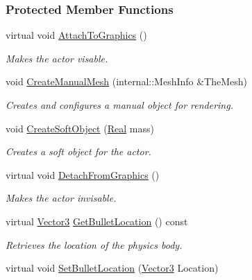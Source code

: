 \subsubsection*{Protected Member Functions}
\begin{DoxyCompactItemize}
\item 
virtual void \hyperlink{classphys_1_1ActorSoft_a37b3bf631e8f73b3f19c3bb043d011c3}{AttachToGraphics} ()
\begin{DoxyCompactList}\small\item\em Makes the actor visable. \item\end{DoxyCompactList}\item 
void \hyperlink{classphys_1_1ActorSoft_a341d9124acd59a4597745c3eff06dfc8}{CreateManualMesh} (internal::MeshInfo \&TheMesh)
\begin{DoxyCompactList}\small\item\em Creates and configures a manual object for rendering. \item\end{DoxyCompactList}\item 
void \hyperlink{classphys_1_1ActorSoft_acc0ff92e2dcc0e5d99ca62f07bc9174d}{CreateSoftObject} (\hyperlink{namespacephys_af7eb897198d265b8e868f45240230d5f}{Real} mass)
\begin{DoxyCompactList}\small\item\em Creates a soft object for the actor. \item\end{DoxyCompactList}\item 
virtual void \hyperlink{classphys_1_1ActorSoft_a568b070c746775b73a3aa8ab33d6cc58}{DetachFromGraphics} ()
\begin{DoxyCompactList}\small\item\em Makes the actor invisable. \item\end{DoxyCompactList}\item 
virtual \hyperlink{classphys_1_1Vector3}{Vector3} \hyperlink{classphys_1_1ActorSoft_a2b30f96cb01df382a774dfae5200fed0}{GetBulletLocation} () const 
\begin{DoxyCompactList}\small\item\em Retrieves the location of the physics body. \item\end{DoxyCompactList}\item 
virtual void \hyperlink{classphys_1_1ActorSoft_aef041f3eee69bb8eceef32fa0513e340}{SetBulletLocation} (\hyperlink{classphys_1_1Vector3}{Vector3} Location)

\end{DoxyCompactItemize}
